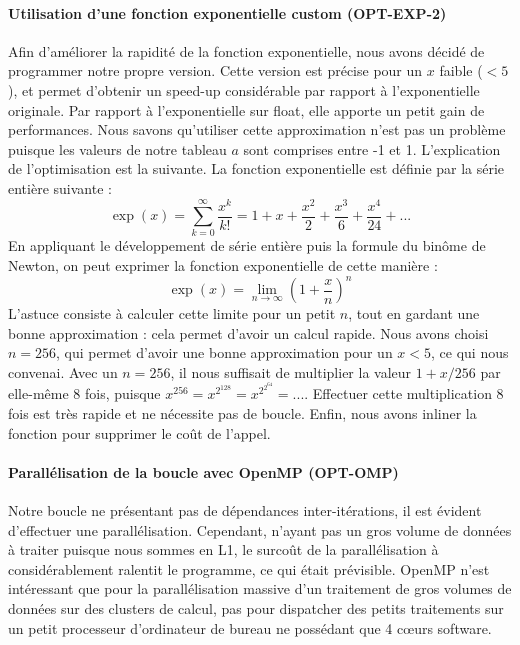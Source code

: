 \documentclass[12pt,a4paper]{article}
\begin{document}
\paragraph{Utilisation d'une fonction exponentielle custom (OPT-EXP-2)} Afin
d'améliorer la rapidité de la fonction exponentielle, nous avons décidé de
programmer notre propre version. Cette version est précise pour un $x$ faible
($< 5$), et permet d'obtenir un speed-up considérable par rapport à
l'exponentielle originale. Par rapport à l'exponentielle sur float, elle
apporte un petit gain de performances. Nous savons qu'utiliser cette
approximation n'est pas un problème puisque les valeurs de notre tableau $a$
sont comprises entre -1 et 1. L'explication de l'optimisation est la suivante.
La fonction exponentielle est définie par la série entière suivante :
\begin{equation*}
    \exp(x) = \sum^{\infty}_{k=0} \frac{x^k}{k!} = 1 + x + \frac{x^2}{2} + \frac{x^3}{6} + \frac{x^4}{24} + ...
\end{equation*}
En appliquant le développement de série entière puis la formule du binôme de
Newton, on peut exprimer la fonction exponentielle de cette manière :
\begin{equation*}
    \exp(x) = \lim_{n \to \infty} \left( 1 + \frac{x}{n} \right)^n
\end{equation*}
L'astuce consiste à calculer cette limite pour un petit $n$, tout en gardant une
bonne approximation : cela permet d'avoir un calcul rapide. Nous avons choisi
$n = 256$, qui permet d'avoir une bonne approximation pour un $x < 5$, ce qui
nous convenai. Avec un $n = 256$, il nous suffisait de multiplier la valeur $1
+ x / 256$ par elle-même 8 fois, puisque $x^{256} = x^{2^{128}} =
x^{2^{2^{64}}} = ...$. Effectuer cette multiplication 8 fois est très rapide et
ne nécessite pas de boucle. Enfin, nous avons inliner la fonction pour supprimer
le coût de l'appel.

\paragraph{Parallélisation de la boucle avec OpenMP (OPT-OMP)}
Notre boucle ne présentant pas de dépendances inter-itérations, il est évident
d'effectuer une parallélisation. Cependant, n'ayant pas un gros volume de
données à traiter puisque nous sommes en L1, le surcoût de la parallélisation à
considérablement ralentit le programme, ce qui était prévisible. OpenMP n'est
intéressant que pour la parallélisation massive d'un traitement de gros volumes
de données sur des clusters de calcul, pas pour dispatcher des petits
traitements sur un petit processeur d'ordinateur de bureau ne possédant que 4
cœurs software.
\end{document}
